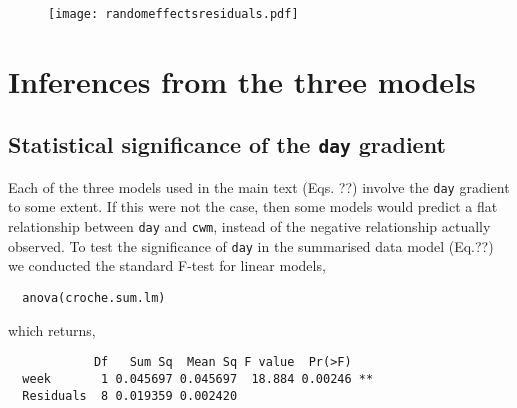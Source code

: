 \documentclass[12pt]{ecologyFORAPPENDIX}
\newcommand{\processfloatnow}{
	\begingroup
	\let\cleardoublepage\relax
	\let\clearpage\relax
	\processdelayedfloats
	\endgroup
}
\begin{document}

\begin{figure}
\texttt{[image: randomeffectsresiduals.pdf]}
\caption{}
\label{fig:randomeffectsresiduals}
\end{figure}
\processfloatnow

\section{Inferences from the three models}

\subsection{Statistical significance of the \texttt{day} gradient}

Each of the three models used in the main text (Eqs. ??) involve the \texttt{day} gradient to some extent.  If this were not the case, then some models would predict a flat relationship between \texttt{day} and \texttt{cwm}, instead of the negative relationship actually observed.  To test the significance of \texttt{day} in the summarised data model (Eq.??) we conducted the standard F-test for linear models,
\vspace{-16pt}
\singlespace 
\begin{verbatim}
  anova(croche.sum.lm)  
\end{verbatim}
\doublespace
which returns,
\vspace{-16pt}
\singlespace 
\begin{verbatim}
            Df   Sum Sq  Mean Sq F value  Pr(>F)   
  week       1 0.045697 0.045697  18.884 0.00246 **
  Residuals  8 0.019359 0.002420
\end{verbatim}
\doublespace
\end{document}
